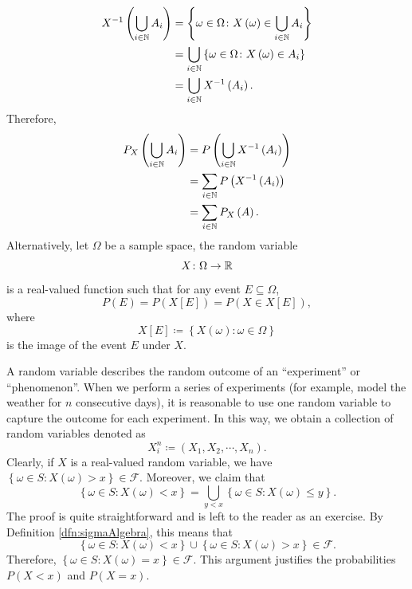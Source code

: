 \documentclass[math]{amznotes}
\theoremstyle{remark}
\newcommand{\0}{\mathbf{0}}
\newcommand{\1}{\mathbf{1}}
\begin{document}
\begin{align*}
    X^{-1}\left(\bigcup_{i \in \mathbb{N}}A_i\right) & = \left\{\omega \in \Omega \colon X\left(\omega\right) \in \bigcup_{i \in \mathbb{N}}A_i\right\} \\
    & = \bigcup_{i \in \mathbb{N}}\left\{\omega \in \Omega \colon X\left(\omega\right) \in A_i\right\} \\
    & = \bigcup_{i \in \mathbb{N}}X^{-1}\left(A_i\right).
\end{align*}
Therefore, 
\begin{align*}
    P_X\left(\bigcup_{i \in \mathbb{N}}A_i\right) & = P\left(\bigcup_{i \in \mathbb{N}}X^{-1}\left(A_i\right)\right) \\
    & = \sum_{i \in \mathbb{N}}P\left(X^{-1}\left(A_i\right)\right) \\
    & = \sum_{i \in \mathbb{N}}P_X\left(A\right).
\end{align*}
Alternatively, let $\Omega$ be a sample space, the random variable 
\begin{displaymath}
    X \colon \Omega \to \mathbb{R}
\end{displaymath}
is a real-valued function such that for any event $E \subseteq \Omega$, 
\begin{equation*}
    P(E) = P(X[E]) = P(X \in X[E]),
\end{equation*}
where
\begin{displaymath}
    X[E] \coloneqq \left\{X(\omega) \colon \omega \in \Omega\right\}
\end{displaymath}
is the image of the event $E$ under $X$.

A random variable describes the random outcome of an ``experiment'' or ``phenomenon''. When we perform a series of experiments (for example, model the weather for $n$ consecutive days), it is reasonable to use one random variable to capture the outcome for each experiment. In this way, we obtain a collection of random variables denoted as 
\begin{equation*}
    X_i^n \coloneqq \left(X_1, X_2, \cdots, X_n\right).
\end{equation*}
Clearly, if $X$ is a real-valued random variable, we have $\left\{\omega \in S \colon X\left(\omega\right) > x\right\} \in \mathcal{F}$. Moreover, we claim that 
\begin{equation*}
    \left\{\omega \in S \colon X\left(\omega\right) < x\right\} = \bigcup_{y < x}\left\{\omega \in S \colon X\left(\omega\right) \leq y\right\}.
\end{equation*}
The proof is quite straightforward and is left to the reader as an exercise. By Definition \ref{dfn:sigmaAlgebra}, this means that 
\begin{equation*}
    \left\{\omega \in S \colon X\left(\omega\right) < x\right\} \cup \left\{\omega \in S \colon X\left(\omega\right) > x\right\} \in \mathcal{F}.
\end{equation*}
Therefore, $\left\{\omega \in S \colon X\left(\omega\right) = x\right\} \in \mathcal{F}$. This argument justifies the probabilities $P\left(X < x\right)$ and $P\left(X = x\right)$. 
\end{document}
